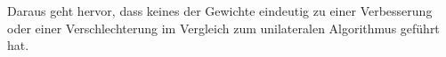 Daraus geht hervor, dass keines der Gewichte eindeutig zu einer Verbesserung oder einer Verschlechterung im Vergleich zum unilateralen Algorithmus geführt hat.




